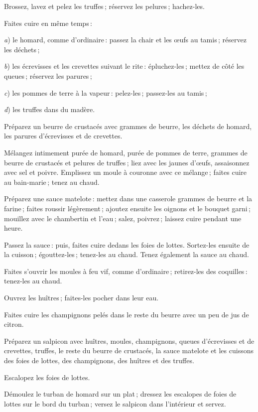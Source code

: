 Brossez, lavez et pelez les truffes ; réservez les pelures ; hachez-les.

Faites cuire en même temps :

\textit{a}) le homard, comme d'ordinaire : passez la chair et les œufs au tamis ;
réservez les déchets ;

\textit{b}) les écrevisses et les crevettes suivant le rite : épluchez-les ;
mettez de côté les queues ; réservez les parures ;

\textit{c}) les pommes de terre à la vapeur : pelez-les ; passez-les au tamis ;

\textit{d}) les truffes dans du madère.

Préparez un beurre de crustacés avec {\mmm} grammes de beurre, les
déchets de homard, les parures d'écrevisses et de crevettes.

Mélangez intimement purée de homard, purée de pommes de terre, {\mmm}
grammes de beurre de crustacés et pelures de truffes ; liez avec les jaunes
d'œufs, assaisonnez avec sel et poivre. Emplissez un moule à couronne avec ce
mélange ; faites cuire au bain-marie ; tenez au chaud.

Préparez une sauce matelote : mettez dans une casserole {\mmm} grammes de
beurre et la farine ; faites roussir légèrement ; ajoutez ensuite les oignons
et le bouquet garni ; mouillez avec le chambertin et l’eau ; salez, poivrez ;
laissez cuire pendant une heure.

Passez la sauce : puis, faites cuire dedans les foies de lottes. Sortez-les
ensuite de la cuisson ; égouttez-les ; tenez-les au chaud. Tenez également la
sauce au chaud.

Faites s'ouvrir les moules à feu vif, comme d'ordinaire ; retirez-les des coquilles :
tenez-les au chaud.

Ouvrez les huîtres ; faites-les pocher dans leur eau.

Faites cuire les champignons pelés dans le reste du beurre avec un peu de jus
de citron.

Préparez un salpicon avec huîtres, moules, champignons, queues d'écrevisses
et de crevettes, truffes, le reste du beurre de crustacés, la sauce matelote et les
cuissons des foies de lottes, des champignons, des huîtres et des truffes.

Escalopez les foies de lottes.

Démoulez le turban de homard sur un plat ; dressez les escalopes de foies de
lottes sur le bord du turban ; versez le salpicon dans l'intérieur et servez.

